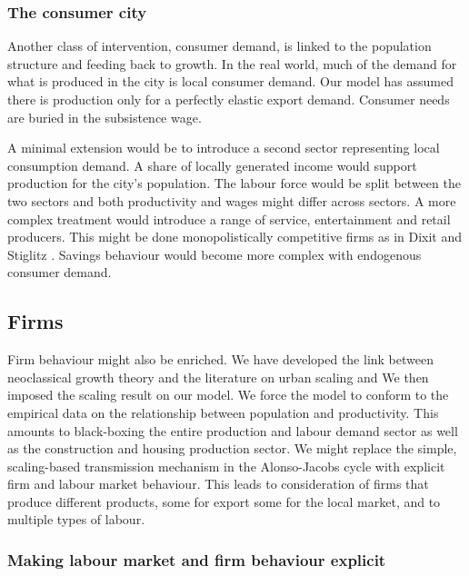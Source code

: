\subsubsection{The consumer city}

Another class of intervention, consumer demand, is linked to the population structure and feeding back to growth. In the real world, much of the demand for what is produced in the city is local consumer demand.  Our model has assumed there is production only for a perfectly elastic export demand. Consumer needs are buried in the subsistence wage. 

A minimal extension would be to introduce a second sector representing local consumption demand. A share of locally generated income would support production for the city's population. The labour force would be split between the two sectors and both productivity and wages might differ across sectors. A more complex treatment would introduce a range of service, entertainment and retail producers. This might be done monopolistically competitive firms as in Dixit and Stiglitz \cite{AvinashK.Dixit1977MCaO}. Savings behaviour would become more complex with endogenous consumer demand. %


\subsection{Firms}

Firm behaviour might also be enriched. We have  developed the link between neoclassical growth theory and the literature on urban scaling \cite{bettencourtIntroductionUrbanScience2021} and  We then imposed the scaling result on our model.  We force the model to conform to the empirical data on the relationship between population and productivity. This amounts to black-boxing the entire production and labour demand sector as well as the construction and housing production sector. 
We might replace the simple, scaling-based transmission mechanism in the Alonso-Jacobs cycle with explicit firm and labour market behaviour. %
This leads to consideration of firms that produce different products, some for export some for the local market, and to multiple types of labour.

\subsubsection{Making labour market and firm behaviour explicit}

